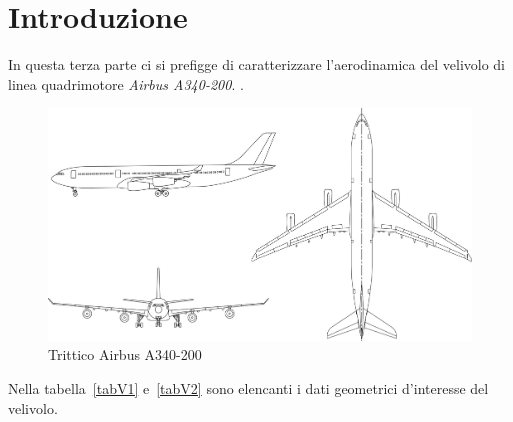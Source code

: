
\chapter{Introduzione}
In questa terza parte ci si prefigge di caratterizzare l’aerodinamica del velivolo di linea quadrimotore \emph{Airbus A340-200}. \cite{author:airbusA340}.\\
\begin {figure} [h!]
\centering
\includegraphics[width= \textwidth ]{images/fileImg/Parte_3-Aerodinamica_Velivolo_A340-200/tritticoA340-200.png}
\caption{\footnotesize Trittico Airbus A340-200}
\label {fig:trittico}
\end {figure}

Nella tabella~\ref{tabV1} e~\vref{tabV2}  sono elencanti i dati geometrici d'interesse del velivolo. \cite{author:airbusA340} \cite{author:Jane}  \\ \\ 


